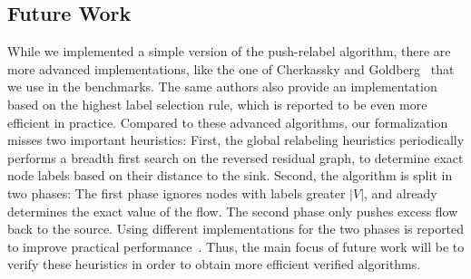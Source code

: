 \documentclass[smallcondensed]{svjour3}     %
\begin{document}
  \subsection{Future Work}
  While we implemented a simple version of the push-relabel algorithm, there are more advanced implementations, like the one of Cherkassky and Goldberg~\cite{ChGo97} that 
  we use in the benchmarks. The same authors also provide an implementation based on the highest label selection rule, which is reported to be even more efficient 
  in practice. 
  Compared to these advanced algorithms, our formalization misses two important heuristics: First, the global relabeling heuristics periodically performs a breadth first search on the reversed residual graph, to determine exact node labels based on their distance to the sink. Second, the algorithm is split in two phases: 
  The first phase ignores nodes with labels greater $|V|$, and already determines the exact value of the flow. The second phase only pushes excess flow back to the source. 
  Using different implementations for the two phases is reported to improve practical performance~\cite{ChGo97}. 
  Thus, the main focus of future work will be to verify these heuristics in order to obtain more efficient verified algorithms.
  
\end{document}
